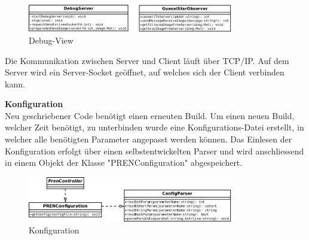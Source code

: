 \begin{figure}[H]
\centering
\includegraphics[width=0.8\textwidth]{03_Loesungskonzept/pictures/DebugView.jpeg}
\caption{Debug-View}
\end{figure}

Die Kommunikation zwischen Server und Client läuft über TCP/IP. Auf dem Server wird ein Server-Socket geöffnet, auf welches sich der Client verbinden kann.

\textbf{Konfiguration}\\[0.2cm]
Neu geschriebener Code benötigt einen erneuten Build. Um einen neuen Build, welcher Zeit benötigt, zu unterbinden wurde eine Konfigurations-Datei erstellt, in welcher alle benötigten Parameter angepasst werden können. Das Einlesen der Konfiguration erfolgt über einen selbstentwickelten Parser und wird anschliessend in einem Objekt der Klasse "PRENConfiguration" abgespeichert.

\begin{figure}[H]
\centering
\includegraphics[width=0.8\textwidth]{03_Loesungskonzept/pictures/Configuration.jpeg}
\caption{Konfiguration}
\end{figure}
 
